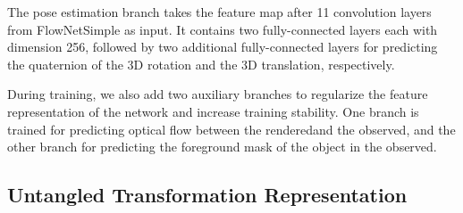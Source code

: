 \documentclass[twocolumn]{svjour3}
\newcommand{\rend}[0]{rendered}
\newcommand{\real}[0]{observed}
\begin{document}
The pose estimation branch takes the feature map after 11 convolution layers from FlowNetSimple as input. It contains two fully-connected layers each with dimension 256, followed by two additional fully-connected layers for predicting the quaternion of the 3D rotation and the 3D translation, respectively. 

During training, we also add two auxiliary branches to regularize the feature representation of the network and increase training stability. One branch is trained for predicting optical flow between the \rend\image and the \real\image, and the other branch for predicting the foreground mask of the object in the \real\image. 


\subsection{Untangled Transformation Representation}
\label{sec:untangle}
\end{document}
